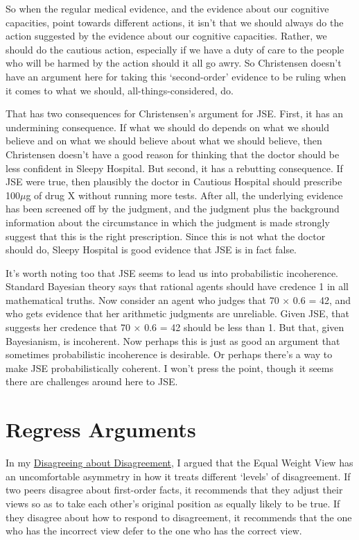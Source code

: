 \documentclass[
  11pt,
  letterpaper,
  DIV=11,
  numbers=noendperiod,
  twoside]{scrartcl}
\begin{document}
So when the regular medical evidence, and the evidence about our
cognitive capacities, point towards different actions, it isn't that we
should always do the action suggested by the evidence about our
cognitive capacities. Rather, we should do the cautious action,
especially if we have a duty of care to the people who will be harmed by
the action should it all go awry. So Christensen doesn't have an
argument here for taking this `second-order' evidence to be ruling when
it comes to what we should, all-things-considered, do.

That has two consequences for Christensen's argument for JSE. First, it
has an undermining consequence. If what we should do depends on what we
should believe and on what we should believe about what we should
believe, then Christensen doesn't have a good reason for thinking that
the doctor should be less confident in Sleepy Hospital. But second, it
has a rebutting consequence. If JSE were true, then plausibly the doctor
in Cautious Hospital should prescribe 100\(\mu\)g of drug X without
running more tests. After all, the underlying evidence has been screened
off by the judgment, and the judgment plus the background information
about the circumstance in which the judgment is made strongly suggest
that this is the right prescription. Since this is not what the doctor
should do, Sleepy Hospital is good evidence that JSE is in fact false.

It's worth noting too that JSE seems to lead us into probabilistic
incoherence. Standard Bayesian theory says that rational agents should
have credence 1 in all mathematical truths. Now consider an agent who
judges that 70 × 0.6 = 42, and who gets evidence that her arithmetic
judgments are unreliable. Given JSE, that suggests her credence that 70
× 0.6 = 42 should be less than 1. But that, given Bayesianism, is
incoherent. Now perhaps this is just as good an argument that sometimes
probabilistic incoherence is desirable. Or perhaps there's a way to make
JSE probabilistically coherent. I won't press the point, though it seems
there are challenges around here to JSE.

\section{Regress Arguments}\label{regress-arguments}

In my \href{http://brian.weatherson.org/DaD.pdf}{Disagreeing about
Disagreement}, I argued that the Equal Weight View has an uncomfortable
asymmetry in how it treats different `levels' of disagreement. If two
peers disagree about first-order facts, it recommends that they adjust
their views so as to take each other's original position as equally
likely to be true. If they disagree about how to respond to
disagreement, it recommends that the one who has the incorrect view
defer to the one who has the correct view.
\end{document}
